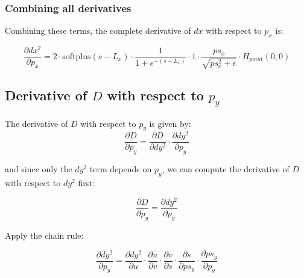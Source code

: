 \documentclass[11pt]{article}
\begin{document}
           \subsubsection*{Combining all derivatives}
            
                Combining these terms, the complete derivative of \(dx\) with respect to \(p_x\) is:

                \begin{equation}
                    \frac{\partial dx^2}{\partial p_x}
                    = 2 \cdot \text{softplus}(s - L_x)
                    \cdot \frac{1}{1 + e^{-(s - L_x)}}
                    \cdot 1
                    \cdot \frac{ps_{x}}{\sqrt{ps_{x}^2 + \epsilon}}
                    \cdot H_{point}(0,0)
                \end{equation}

        \subsection*{Derivative of $D$ with respect to $p_y$}

            The derivative of \(D\) with respect to \(p_y\) is given by:
            \begin{equation}
                \frac{\partial D}{\partial p_y} = \frac{\partial D}{\partial dy^2} \cdot \frac{\partial dy^2}{\partial p_y}
            \end{equation}
            
            and since only the \(dy^2\) term depends on \(p_y\), we can compute the derivative of \(D\) with respect to \(dy^2\) first:
            
            \begin{equation}
                \frac{\partial D}{\partial p_y} = \frac{\partial dy^2}{\partial p_y}
            \end{equation}
            
            Apply the chain rule:
            
            \begin{equation}
                \frac{\partial dy^2}{\partial p_y}
                = \frac{\partial dy^2}{\partial u}
                \cdot \frac{\partial u}{\partial v}
                \cdot \frac{\partial v}{\partial s}
                \cdot \frac{\partial s}{\partial ps_{y}}
                \cdot \frac{\partial ps_{y}}{\partial p_y}
            \end{equation}
            
\end{document}
